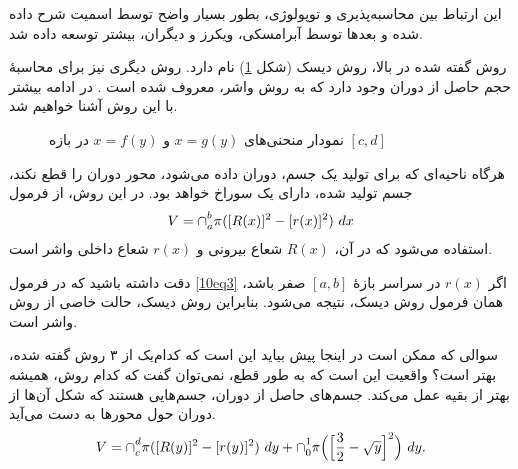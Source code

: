  این ارتباط بین محاسبه‌پذیری و توپولوژی، بطور بسیار واضح توسط اسمیت  شرح داده شده و  بعدها توسط آبرامسکی، ویکرز و دیگران، بیشتر توسعه داده شد.

روش گفته شده در بالا، روش دیسک (شکل \ref{fig1-6}) نام دارد. روش دیگری نیز برای محاسبهٔ
حجم حاصل از دوران وجود دارد که به روش واشر، معروف شده است . در ادامه بیشتر با این روش آشنا خواهیم شد.%
\cite{vahid90}

\begin{figure}[]
\centering
{}
\caption{نمودار منحنی‌های 
 $x=g(y)$ و $x=f(y)$
 در بازه $[c,d]$}
\label{fig1-6}
\end{figure}
\begin{pdefinition1}\label{defi4}
هرگاه ناحیه‌ای که برای تولید یک جسم، دوران داده می‌شود، محور دوران را قطع نکند، جسم تولید شده، دارای یک سوراخ خواهد بود. در این روش، از فرمول
\begin{align}\label{10eq3}
V=\mathbin{\mathstrut{\cap}}_a^b \pi ([R(x)]^2-[r(x)]^2)\ d x
\end{align}
استفاده می‌شود که در آن، $R(x)$ 
شعاع بیرونی
 و
 $r(x)$
 شعاع داخلی واشر
 است. 
\end{pdefinition1}
دقت داشته باشید که در فرمول \eqref{10eq3} اگر $r(x)$ در سراسر بازهٔ
$[a,b]$ 
صفر باشد، همان فرمول روش دیسک، نتیجه می‌شود. بنابراین روش دیسک، حالت خاصی از روش واشر است.
 
سوالی که ممکن است در اینجا پیش بیاید این است که کدام‌یک از ۳ روش گفته شده، بهتر است؟ واقعیت این است که به طور قطع، نمی‌توان گفت که کدام روش، همیشه بهتر از بقیه عمل می‌کند.
جسم‌های حاصل از دوران، جسم‌هایی هستند که شکل آن‌ها از دوران حول محور‌ها به دست می‌آید. 
\begin{align*}
V=\mathbin{\mathstrut{\cap}}_c^d\pi ([R(y)]^2-[r(y)]^2)\ d y+
\mathbin{\mathstrut{\cap}}_0^1\pi \Big(\Big[\dfrac{3}{2}-\sqrt{y}\Big]^2\Big)\ d y.
\end{align*}

